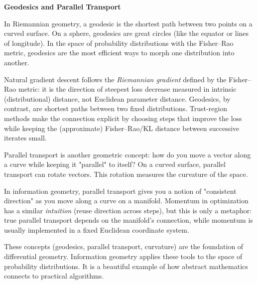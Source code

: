 \begin{geometrylens}
\textbf{Geodesics and Parallel Transport}

\vspace{0.5em}

In Riemannian geometry, a geodesic is the shortest path between two points on a curved surface. On a sphere, geodesics are great circles (like the equator or lines of longitude). In the space of probability distributions with the Fisher--Rao metric, geodesics are the most efficient ways to morph one distribution into another.

\vspace{0.5em}

Natural gradient descent follows the \emph{Riemannian gradient} defined by the Fisher--Rao metric: it is the direction of steepest loss decrease measured in intrinsic (distributional) distance, not Euclidean parameter distance. Geodesics, by contrast, are shortest paths between two fixed distributions. Trust-region methods make the connection explicit by choosing steps that improve the loss while keeping the (approximate) Fisher--Rao/KL distance between successive iterates small.

\vspace{0.5em}

Parallel transport is another geometric concept: how do you move a vector along a curve while keeping it "parallel" to itself? On a curved surface, parallel transport can rotate vectors. This rotation measures the curvature of the space.

\vspace{0.5em}

In information geometry, parallel transport gives you a notion of "consistent direction" as you move along a curve on a manifold. Momentum in optimization has a similar \emph{intuition} (reuse direction across steps), but this is only a metaphor: true parallel transport depends on the manifold's connection, while momentum is usually implemented in a fixed Euclidean coordinate system.

\vspace{0.5em}

These concepts (geodesics, parallel transport, curvature) are the foundation of differential geometry. Information geometry applies these tools to the space of probability distributions. It is a beautiful example of how abstract mathematics connects to practical algorithms.
\end{geometrylens}

